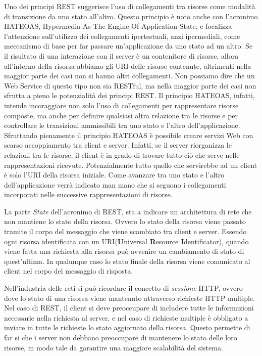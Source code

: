 \begin{description}
\begin{description}[style=unboxed,leftmargin=0cm]
\item[Hypermedia as the Engine of Application State (HATEOAS)] 
\label{itm:hateoas}
Uno dei principi REST suggerisce l'uso di collegamenti tra risorse come modalità di transizione da uno stato all'altro. Questo principio è noto anche con l'acronimo HATEOAS, Hypermedia As The Engine Of Application State, e focalizza l'attenzione sull'utilizzo dei collegamenti ipertestuali, anzi ipermediali, come meccanismo di base per far passare un'applicazione da uno stato ad un altro.
Se il risultato di una interazione con il server è un contenitore di risorse, allora all’interno della risorsa abbiamo gli URI delle risorse contenute, altrimenti nella maggior parte dei casi non si hanno altri collegamenti. Non possiamo dire che un Web Service di questo tipo non sia RESTful, ma nella maggior parte dei casi non sfrutta a pieno le potenzialità dei principi REST.
Il principio HATEOAS, infatti, intende incoraggiare non solo l’uso di collegamenti per rappresentare risorse composte, ma anche per definire qualsiasi altra relazione tra le risorse e per controllare le transizioni ammissibili tra uno stato e l’altro dell’applicazione.
Sfruttando pienamente il principio HATEOAS è possibile creare servizi Web con scarso accoppiamento tra client e server. Infatti, se il server riorganizza le relazioni tra le risorse, il client è in grado di trovare tutto ciò che serve nelle rappresentazioni ricevute. Potenzialmente tutto quello che servirebbe ad un client è solo l’URI della risorsa iniziale. Come avanzare tra uno stato e l’altro dell’applicazione verrà indicato man mano che si seguono i collegamenti incorporati nelle successive rappresentazioni di risorse.
\hspace*{\fill}\cite{web:hateoas}
\end{description}


\item[Stateless]

La parte \emph{State} dell'acronimo di REST, sta a indicare un architettura di rete che non mantiene lo stato della risorsa. Ovvero lo stato della risorsa viene passato tramite il corpo del messaggio che viene scambiato tra client e server. Essendo ogni risorsa identificata con un URI(\textbf{U}niversal \textbf{R}esource \textbf{I}dentificator), quando viene fatta una richiesta alla risorsa può avvenire un cambiamento di stato di quest'ultima. In qualunque caso lo stato finale della risorsa viene comunicato al client nel corpo del messaggio di risposta.

Nell'industria delle reti si può ricordare il concetto di \emph{sessione} HTTP, ovvero dove lo stato di una risorsa viene mantenuto attraverso richieste HTTP multiple. Nel caso di REST, il client si deve preoccupare di includere tutte le informazioni necessarie nella richiesta al server, e nel caso di richieste multiple è obbligato a inviare in tutte le richieste lo stato aggiornato della risorsa. Questo permette di far si che i server non debbano preoccupare di mantenere lo stato delle loro risorse, in modo tale da garantire una maggiore scalabilità del sistema.


\end{description}
